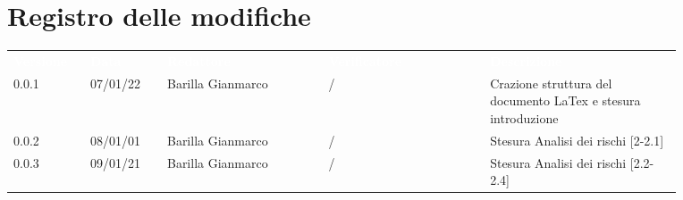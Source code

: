 \section*{Registro delle modifiche}

{\renewcommand{\arraystretch}{1.5}
\begin{tabular}{p{0.10\linewidth}p{0.10\linewidth}p{0.21\linewidth}p{0.21\linewidth}p{0.25\linewidth}}
	\rowcolor[RGB]{33, 73, 50}
	\textcolor{white}{\textbf{Versione}} & \textcolor{white}{\textbf{Data}} & \textcolor{white}
	{\textbf{Redattore}} & \textcolor{white}{\textbf{Verificatore}} & \textcolor{white}
	{\textbf{Descrizione}}\\
	\rowcolor[RGB]{216, 235, 171}
	0.0.1 & 07/01/22 & Barilla Gianmarco & / & Crazione struttura del documento LaTex e stesura introduzione\\
	\rowcolor[RGB]{233, 245, 206}
	0.0.2 & 08/01/01 & Barilla Gianmarco & / & Stesura Analisi dei rischi [2-2.1]\\
	\rowcolor[RGB]{216, 235, 171}
	0.0.3 & 09/01/21 & Barilla Gianmarco& / & Stesura Analisi dei rischi [2.2-2.4]\\
	
\end{tabular}	
}